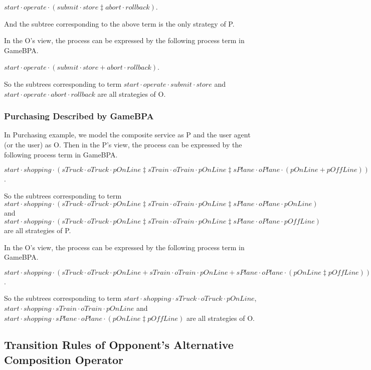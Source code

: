 \documentclass{fac}
\begin{document}
$start\cdot operate\cdot (submit\cdot store \ddagger abort\cdot rollback)$.

And the subtree corresponding to the above term is the only strategy of P.

In the O's view, the process can be expressed by the following process term in GameBPA.

$start\cdot operate\cdot (submit\cdot store + abort\cdot rollback)$.

So the subtrees corresponding to term $start\cdot operate\cdot submit\cdot store$ and $start\cdot operate\cdot abort\cdot rollback$ are all strategies of O.

\subsubsection{Purchasing Described by GameBPA}

In Purchasing example, we model the composite service as P and the user agent (or the user) as O. Then in the P's view, the process can be expressed by the following process term in GameBPA.

$start\cdot shopping\cdot (sTruck\cdot oTruck\cdot pOnLine \ddagger sTrain\cdot oTrain\cdot pOnLine \ddagger sPlane \cdot oPlane \cdot (pOnLine + pOffLine))$.

So the subtrees corresponding to term $start\cdot shopping\cdot (sTruck\cdot oTruck\cdot pOnLine \ddagger sTrain\cdot oTrain\cdot pOnLine \ddagger sPlane \cdot oPlane \cdot pOnLine)$ and $start\cdot shopping\cdot (sTruck\cdot oTruck\cdot pOnLine \ddagger sTrain\cdot oTrain\cdot pOnLine \ddagger sPlane \cdot oPlane \cdot pOffLine)$ are all strategies of P.

In the O's view, the process can be expressed by the following process term in GameBPA.

$start\cdot shopping\cdot (sTruck\cdot oTruck\cdot pOnLine + sTrain\cdot oTrain\cdot pOnLine + sPlane \cdot oPlane \cdot (pOnLine \ddagger pOffLine))$.

So the subtrees corresponding to term $start\cdot shopping\cdot sTruck\cdot oTruck\cdot pOnLine$, $start\cdot shopping\cdot sTrain\cdot oTrain\cdot pOnLine$ and $start\cdot shopping\cdot sPlane \cdot oPlane \cdot (pOnLine \ddagger pOffLine)$ are all strategies of O.

\subsection{Transition Rules of Opponent's Alternative Composition Operator}
\end{document}
